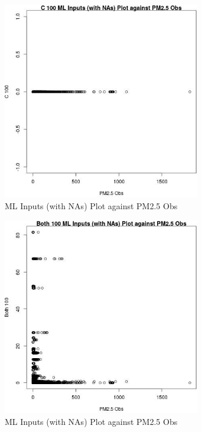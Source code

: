 \begin{figure} 
\centering  
\includegraphics[width=0.77\textwidth]{Code_Outputs/Report_ML_input_PM25_Step4_part_e_de_duplicated_aveswNAs_C_100vPM25_Obs.jpg} 
\caption{\label{fig:Report_ML_input_PM25_Step4_part_e_de_duplicated_aveswNAsC_100vPM25_Obs}ML Inputs (with NAs) Plot against PM2.5 Obs} 
\end{figure} 
 

\begin{figure} 
\centering  
\includegraphics[width=0.77\textwidth]{Code_Outputs/Report_ML_input_PM25_Step4_part_e_de_duplicated_aveswNAs_Both_100vPM25_Obs.jpg} 
\caption{\label{fig:Report_ML_input_PM25_Step4_part_e_de_duplicated_aveswNAsBoth_100vPM25_Obs}ML Inputs (with NAs) Plot against PM2.5 Obs} 
\end{figure} 
 

